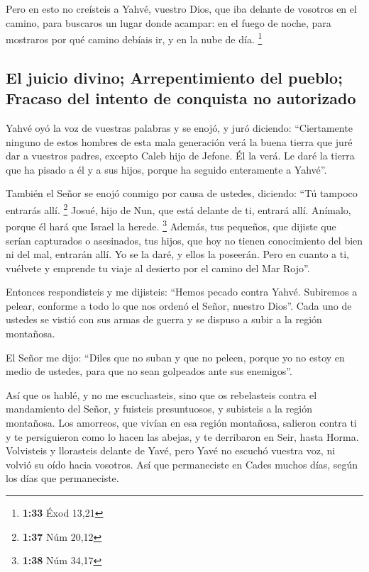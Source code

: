  Pero en esto no creísteis a Yahvé, vuestro Dios,
 que iba delante de vosotros en el camino, para buscaros
un lugar donde acampar: en el fuego de noche, para mostraros por qué
camino debíais ir, y en la nube de día. \footnote{\textbf{1:33} Éxod
  13,21}

\hypertarget{el-juicio-divino-arrepentimiento-del-pueblo-fracaso-del-intento-de-conquista-no-autorizado}{%
\subsection{El juicio divino; Arrepentimiento del pueblo; Fracaso del
intento de conquista no
autorizado}\label{el-juicio-divino-arrepentimiento-del-pueblo-fracaso-del-intento-de-conquista-no-autorizado}}

 Yahvé oyó la voz de vuestras palabras y se enojó, y juró
diciendo:  ``Ciertamente ninguno de estos hombres de esta
mala generación verá la buena tierra que juré dar a vuestros padres,
 excepto Caleb hijo de Jefone. Él la verá. Le daré la
tierra que ha pisado a él y a sus hijos, porque ha seguido enteramente a
Yahvé''.

 También el Señor se enojó conmigo por causa de ustedes,
diciendo: ``Tú tampoco entrarás allí. \footnote{\textbf{1:37} Núm 20,12}
 Josué, hijo de Nun, que está delante de ti, entrará
allí. Anímalo, porque él hará que Israel la herede. \footnote{\textbf{1:38}
  Núm 34,17}  Además, tus pequeños, que dijiste que
serían capturados o asesinados, tus hijos, que hoy no tienen
conocimiento del bien ni del mal, entrarán allí. Yo se la daré, y ellos
la poseerán.  Pero en cuanto a ti, vuélvete y emprende tu
viaje al desierto por el camino del Mar Rojo''.

 Entonces respondisteis y me dijisteis: ``Hemos pecado
contra Yahvé. Subiremos a pelear, conforme a todo lo que nos ordenó el
Señor, nuestro Dios''. Cada uno de ustedes se vistió con sus armas de
guerra y se dispuso a subir a la región montañosa.

 El Señor me dijo: ``Diles que no suban y que no peleen,
porque yo no estoy en medio de ustedes, para que no sean golpeados ante
sus enemigos''.

 Así que os hablé, y no me escuchasteis, sino que os
rebelasteis contra el mandamiento del Señor, y fuisteis presuntuosos, y
subisteis a la región montañosa.  Los amorreos, que
vivían en esa región montañosa, salieron contra ti y te persiguieron
como lo hacen las abejas, y te derribaron en Seir, hasta Horma.
 Volvisteis y llorasteis delante de Yavé, pero Yavé no
escuchó vuestra voz, ni volvió su oído hacia vosotros. 
Así que permaneciste en Cades muchos días, según los días que
permaneciste.

